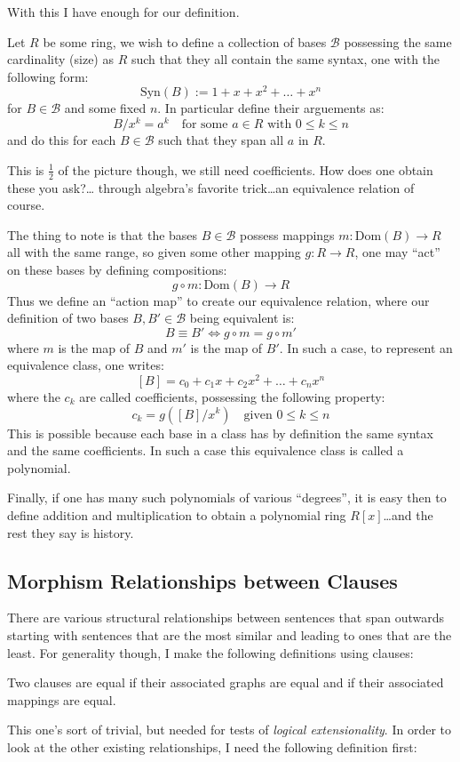 \documentclass[twoside]{article}
\newenvironment{definition}[1][Definition]{\begin{trivlist}
\item[\hskip \labelsep {\bfseries #1}]}{\end{trivlist}}
\begin{document}
With this I have enough for our definition.

Let $ R $ be some ring, we wish to define a collection of bases $ \mathcal{B} $ possessing the same
cardinality (size) as $ R $ such that they all contain the same syntax, one with the following form:
$$ \mbox{Syn}(B):=1+x+x^2+\ldots+x^n $$
for $ B\in\mathcal{B} $ and some fixed $ n $.  In particular define their arguements as:
$$ B/x^k=a^k\quad\mbox{for some } a\in R\mbox{ with } 0\le k\le n $$
and do this for each $ B\in\mathcal{B} $ such that they span all $ a $ in $ R $.

This is $ \frac{1}{2} $ of the picture though, we still need coefficients.  How does one obtain these you ask?\ldots
through algebra's favorite trick\ldots an equivalence relation of course.

The thing to note is that the bases $ B\in\mathcal{B} $ possess mappings $ m:\mbox{Dom}(B)\to R $ all with the same range,
so given some other mapping $ g:R\to R $, one may ``act'' on these bases by defining compositions:
$$ g\circ m:\mbox{Dom}(B)\to R $$
Thus we define an ``action map'' to create our equivalence relation, where our definition of two bases
$ B, B'\in\mathcal{B} $ being equivalent is:
$$ B\equiv B'\Longleftrightarrow g\circ m=g\circ m' $$
where $ m $ is the map of $ B $ and $ m' $ is the map of $ B' $.  In such a case, to represent an equivalence class,
one writes:
$$ [B]=c_0+c_1x+c_2x^2+\ldots+c_nx^n $$
where the $ c_k $ are called coefficients, possessing the following property:
$$ c_k=g([B]/x^k)\quad\mbox{given } 0\le k\le n $$
This is possible because each base in a class has by definition the same syntax and the same coefficients.
In such a case this equivalence class is called a polynomial.

Finally, if one has many such polynomials of various ``degrees'', it is easy then to define addition
and multiplication to obtain a polynomial ring $ R[x] $\ldots and the rest they say is history.

\subsection{Morphism Relationships between Clauses}

There are various structural relationships between sentences that span outwards starting with sentences that are the most
similar and leading to ones that are the least.  For generality though, I make the following definitions using clauses:

\begin{definition}[Equality]

Two clauses are equal if their associated graphs are equal and if their associated mappings are equal.

\end{definition}
This one's sort of trivial, but needed for tests of \emph{logical extensionality}.  In order to look at the other
existing relationships, I need the following definition first:
\end{document}
